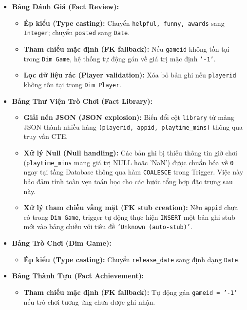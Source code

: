 \begin{itemize}
    \item \textbf{Bảng Đánh Giá (Fact Review):}
    \begin{itemize}
        \item \textbf{Ép kiểu (Type casting):} Chuyển \texttt{helpful, funny, awards} sang \texttt{Integer}; chuyển \texttt{posted} sang \texttt{Date}.
        \item \textbf{Tham chiếu mặc định (FK fallback):} Nếu \texttt{gameid} không tồn tại trong \texttt{Dim Game}, hệ thống tự động gán về giá trị mặc định \texttt{'-1'}.
        \item \textbf{Lọc dữ liệu rác (Player validation):} Xóa bỏ bản ghi nếu \texttt{playerid} không tồn tại trong \texttt{Dim Player}.
    \end{itemize}

    \item \textbf{Bảng Thư Viện Trò Chơi (Fact Library):}
    \begin{itemize}
        \item \textbf{Giải nén JSON (JSON explosion):} Biến đổi cột \texttt{library} từ mảng JSON thành nhiều hàng \texttt{(playerid, appid, playtime\_mins)} thông qua truy vấn CTE.
        \item \textbf{Xử lý Null (Null handling):} Các bản ghi bị thiếu thông tin giờ chơi (\texttt{playtime\_mins} mang giá trị NULL hoặc 'NaN') được chuẩn hóa về \texttt{0} ngay tại tầng Database thông qua hàm \texttt{COALESCE} trong Trigger. Việc này bảo đảm tính toàn vẹn toán học cho các bước tổng hợp đặc trưng sau này.
        \item \textbf{Xử lý tham chiếu vắng mặt (FK stub creation):} Nếu \texttt{appid} chưa có trong \texttt{Dim Game}, trigger tự động thực hiện \texttt{INSERT} một bản ghi stub mới vào bảng chiều với tiêu đề \texttt{'Unknown (auto-stub)'}.
    \end{itemize}

    \item \textbf{Bảng Trò Chơi (Dim Game):}
    \begin{itemize}
        \item \textbf{Ép kiểu (Type casting):} Chuyển \texttt{release\_date} sang định dạng \texttt{Date}.
    \end{itemize}

    \item \textbf{Bảng Thành Tựu (Fact Achievement):}
    \begin{itemize}
        \item \textbf{Tham chiếu mặc định (FK fallback):} Tự động gán \texttt{gameid = '-1'} nếu trò chơi tương ứng chưa được ghi nhận.
    \end{itemize}
\end{itemize}